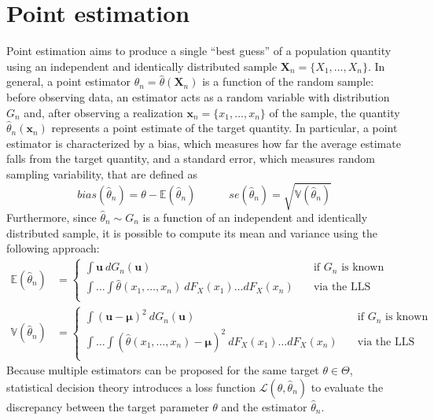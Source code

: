 \documentclass{report}
\begin{document}
\section{Point estimation}
Point estimation aims to produce a single ``best guess'' of a population quantity using an independent and identically distributed sample $\displaystyle \mathbf{X}_n = \{X_1, \dots, X_n\}$. \newline
In general, a point estimator $\displaystyle \hat{\theta}_n = \hat{\theta}(\mathbf{X}_n)$ is a function of the random sample: before observing data, an estimator acts as a random variable with distribution $\displaystyle G_n$ and, after observing a realization $\displaystyle \mathbf{x}_n = \{x_1, \dots, x_n\}$ of the sample, the quantity $\displaystyle \hat{\theta}_n(\mathbf{x}_n)$ represents a point estimate of the target quantity. \newline
In particular, a point estimator is characterized by a bias, which measures how far the average estimate falls from the target quantity, and a standard error, which measures random sampling variability, that are defined as
\[bias(\hat{\theta}_n) = \theta - \mathbb{E}(\hat{\theta}_n) \quad\quad\quad se(\hat{\theta}_n) = \sqrt{\mathbb{V}(\hat{\theta}_n)}\]
Furthermore, since $\displaystyle \hat{\theta}_n \sim G_n$ is a function of an independent and identically distributed sample, it is possible to compute its mean and variance using the following approach:
\begin{align*}
    \mathbb{E}(\hat{\theta}_n) &= \begin{cases}
        \int \mathbf{u} \ dG_n(\mathbf{u}) &\quad\text{if $G_n$ is known} \\
        \int\dots\int \hat{\theta}(x_1, \dots, x_n) \ dF_X(x_1)\dots dF_X(x_n) &\quad\text{via the LLS} \\
    \end{cases} \\
    \mathbb{V}(\hat{\theta}_n) &= \begin{cases}
        \int (\mathbf{u} - \mathbf{\mu})^2 \ dG_n(\mathbf{u}) &\quad\text{if $G_n$ is known} \\
        \int\dots\int (\hat{\theta}(x_1, \dots, x_n) - \mathbf{\mu})^2 \ dF_X(x_1)\dots dF_X(x_n) &\quad\text{via the LLS} \\
    \end{cases}
\end{align*}
Because multiple estimators can be proposed for the same target $\displaystyle \theta \in \Theta$, statistical decision theory introduces a loss function $\displaystyle \mathcal{L}(\theta, \hat{\theta}_n)$ to evaluate the discrepancy between the target parameter $\displaystyle \theta$ and the estimator $\displaystyle \hat{\theta}_n$. \newline
\end{document}
